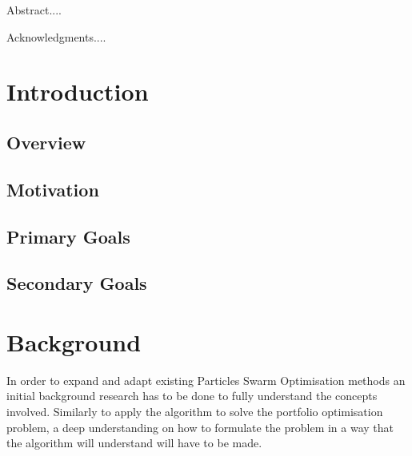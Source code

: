 \documentclass{pdfmx4020}
\begin{document}
\newfrontpage


\begin{Abstract}
Abstract....
\end{Abstract}

\begin{Acknowledgments}
Acknowledgments....
\end{Acknowledgments}

\StartThesis

\listoffigures
\listoftables

\chapter{Introduction}
  \section{Overview} %
  \label{sec:overview}
  

  \section{Motivation} %
  \label{sec:motivation}

  \section{Primary Goals} %
  \label{sec:primary_goals}
  

  \section{Secondary Goals} %
  \label{sec:secondary_goals}
  

\chapter{Background}\label{chap:background}
  In order to expand and adapt existing Particles Swarm Optimisation methods an initial background research has to be done to fully understand the concepts involved. Similarly to apply the algorithm to solve the portfolio optimisation problem, a deep understanding on how to formulate the problem in a way that the algorithm will understand will have to be made. 
\end{document}
